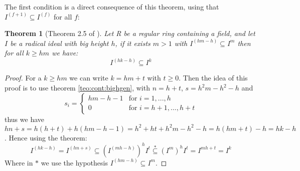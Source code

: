 \documentclass[a4wide]{book}
\theoremstyle{plain}
\newtheorem{teo}{Theorem}[section]
\theoremstyle{remark}
\theoremstyle{definition}
\newcommand{\Z}{\mathbb{Z}}
\newcommand{\cont}[2]{ I^{(#1)} \subseteq I^{#2}}
\newcounter{que}
\begin{document}
The first condition is a direct consequence of this theorem, using that $ \cont{f+1}{(f)} $ for all $ f $:

\begin{teo}[Theorem 2.5 of \cite{Grifo20}] \label{teo:cont:grifo1}
Let R be a regular ring containing a field, and let $ I $ be a radical ideal with big height $ h $, if it exists $ m>1 $ with $ \cont{hm -h}{m} $ then for all $ k \geq hm $ we have:
$$ \cont{hk - h}{k} $$
\end{teo}

\begin{proof}
For a $ k\geq hm  $ we can write $ k = hm + t $ with $ t\geq 0 $. Then the idea of this proof is to use theorem \ref{teo:cont:bighgen}, with $ n= h+ t $, $ s = h^2m - h^2 - h$ and 
\begin{equation}\label{eq:defsi}
s_i = \begin{cases}
hm-h-1 & \text{for } i = 1 , ... ,h\\
0 &\text{for }  i =h+1 , ..., h + t
\end{cases}
\end{equation}
thus we have $ hn + s = h(h+t) + h(hm-h-1)= h^2 + ht + h^2m - h^2 - h = h(hm + t) - h = hk - h$. Hence using the theorem:
\begin{equation}\label{eq:teo:grifo1}
I^{ ( hk - h)} = I^{ (hn + s)} \subseteq {( I^{ (mh -h ) } )}^h {I}^t \stackrel{*}{\subseteq} (I^m)^h I^t = I^{ mh +t} = I^k
\end{equation}
Where in $\ast$ we use the hypothesis $ \cont{hm-h}{m} $.
\end{proof}




 	
\end{document}

